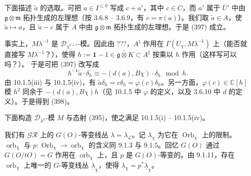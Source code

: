 下面描述 $\tilde a$ 的选取。可把 $a\in I^{\le 0}$ 写成 $c+a'$，其中 $c\in C$，而 $a'$ 属于 $\overline{U}'$ 中由 $\mathfrak{g}\otimes\mathfrak{m}$ 拓扑生成的左理想（按 3.6.8 – 3.6.9，有 $c=\pi(a)$）。我们取 $\tilde a\in A$，使 $\tilde a\mapsto a$，且 $\tilde a-c$ 属于 $A$ 中由 $\mathfrak{g}\otimes\mathfrak{m}$ 拓扑生成的左理想。于是 (397) 成立。

事实上，$M\lambda^{-1}$ 是 $\mathcal{D}_{\lambda^{h+1}}$-模。因此由 ???，$A^{\natural}$ 作用在 $\Gamma(U_{\chi},M\lambda^{-1})$ 上（能否就直接写 $M\lambda^{-1}$？），使得 $h:=\mathbf{1}-1\in\widetilde{\mathfrak{g}\otimes K}\subset A^{\natural}$ 按乘以 $h$ 作用（这样写可以吗？）。
于是可把 (397) 改写成
\begin{equation}\tag{398}
h^{-1}\tilde a\cdot\delta_{h}\equiv-(d(a),B\chi)\cdot\delta_{h}\mod h.
\end{equation}
由 10.1.5(iii) 与 10.1.5(iv)，有 $\tilde a\delta_{h}=c\delta_{h}=\varphi(c)\delta_{h}$。另一方面，$\varphi(c)\in\mathbb{C}[h]$ 模 $h^{2}$ 同余于 $-(d(a),B\chi)h$（见 10.1.5 中 $\varphi$ 的定义，以及 3.6.10 中 $d$ 的定义）。于是得到 (398)。

 下面构造 $\mathcal{D}_{\lambda^{h}}$-模 $M$ 与态射 (395)，使之满足 10.1.5(i) – 10.1.5(iv)。

我们有 $\mathcal{GR}$ 上的 $G(O)$-等变线丛 $\lambda=\lambda_{\mathcal{L}}$。记 $\lambda_{\chi}$ 为它在 $\operatorname{Orb}_{\chi}$ 上的限制。$\operatorname{orb}_{\chi}$ 与 $p:\operatorname{Orb}_{\chi}\to\operatorname{orb}_{\chi}$ 的含义同 9.1.3 与 9.1.5。回忆 $G(O)$ 通过 $G(O/tO)=G$ 作用在 $\operatorname{orb}_{\chi}$ 上，且 $p$ 是 $G(O)$-等变的。由 9.1.11，存在 $\operatorname{orb}_{\chi}$ 上唯一的 $G$-等变线丛 $\underline{\lambda}_{\chi}$，使得 $\lambda_{\chi}=p^{*}\underline{\lambda}_{\chi}$。

